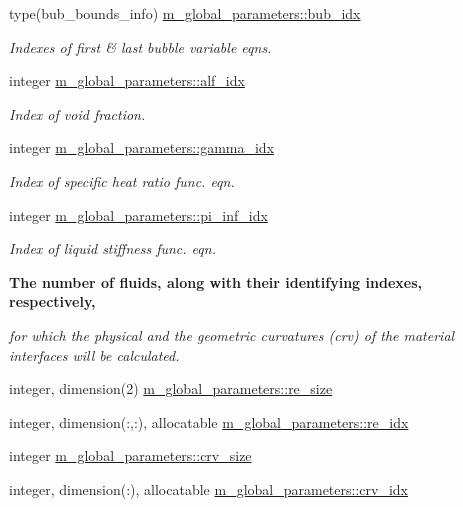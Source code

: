 \begin{Indent}
\begin{DoxyCompactItemize}
type(bub\+\_\+bounds\+\_\+info) \hyperlink{namespacem__global__parameters_a9a425d1bd91d1765043adf8410b98bf7}{m\+\_\+global\+\_\+parameters\+::bub\+\_\+idx}
\begin{DoxyCompactList}\small\item\em Indexes of first \& last bubble variable eqns. \end{DoxyCompactList}\item 
integer \hyperlink{namespacem__global__parameters_af451fa7762c859ef20552498fa6edb16}{m\+\_\+global\+\_\+parameters\+::alf\+\_\+idx}
\begin{DoxyCompactList}\small\item\em Index of void fraction. \end{DoxyCompactList}\item 
integer \hyperlink{namespacem__global__parameters_a4ecdedaf3db880f8d71dbefc816322f8}{m\+\_\+global\+\_\+parameters\+::gamma\+\_\+idx}
\begin{DoxyCompactList}\small\item\em Index of specific heat ratio func. eqn. \end{DoxyCompactList}\item 
integer \hyperlink{namespacem__global__parameters_a7db1a23566279bdbc7da68850c596c69}{m\+\_\+global\+\_\+parameters\+::pi\+\_\+inf\+\_\+idx}
\begin{DoxyCompactList}\small\item\em Index of liquid stiffness func. eqn. \end{DoxyCompactList}\end{DoxyCompactItemize}
\end{Indent}
\begin{Indent}\textbf{ The number of fluids, along with their identifying indexes, respectively,}\par
{\em for which the physical and the geometric curvatures (crv) of the material interfaces will be calculated. }\begin{DoxyCompactItemize}
\item 
integer, dimension(2) \hyperlink{namespacem__global__parameters_a0a67704d4c227871a155d6c26590f685}{m\+\_\+global\+\_\+parameters\+::re\+\_\+size}
\item 
integer, dimension(\+:,\+:), allocatable \hyperlink{namespacem__global__parameters_a33b4272ac0c75aff15851f9dfa6a9d14}{m\+\_\+global\+\_\+parameters\+::re\+\_\+idx}
\item 
integer \hyperlink{namespacem__global__parameters_a30e6fe4c4ff6a8cfefa1bf882dc2e90e}{m\+\_\+global\+\_\+parameters\+::crv\+\_\+size}
\item 
integer, dimension(\+:), allocatable \hyperlink{namespacem__global__parameters_a7b7945c133bf17eb1f25468a6d1a6925}{m\+\_\+global\+\_\+parameters\+::crv\+\_\+idx}
\end{DoxyCompactItemize}
\end{Indent}
